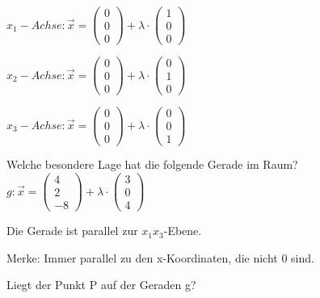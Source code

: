 \documentclass[paper=a6,landscape,ngerman,twoside=true,fontsize=12pt]{scrartcl}
\begin{document}
\begin{antwort}
	\Large
	$x_1-Achse:\vec{x}=\left(\begin{array}{c} 0 \\ 0 \\ 0\end{array} \right)+\lambda \cdot \left(\begin{array}{c} 1 \\ 0 \\ 0\end{array} \right)$
	
	$x_2-Achse:\vec{x}=\left(\begin{array}{c} 0 \\ 0 \\ 0\end{array} \right)+\lambda \cdot \left(\begin{array}{c} 0 \\ 1 \\ 0\end{array} \right)$
	
	$x_3-Achse:\vec{x}=\left(\begin{array}{c} 0 \\ 0 \\ 0\end{array} \right)+\lambda \cdot \left(\begin{array}{c} 0 \\ 0 \\ 1\end{array} \right)$
	
	
\end{antwort}	
\begin{frage}
	\LARGE
	Welche besondere Lage hat die folgende Gerade im Raum?
	$g:\vec{x}=\left(\begin{array}{c} 4 \\ 2 \\ -8\end{array} \right)+\lambda \cdot \left(\begin{array}{c} 3 \\ 0 \\ 4\end{array} \right)$
\end{frage}
\begin{antwort}
	\Large
	Die Gerade ist parallel zur $x_1x_3$-Ebene.
	
	Merke: Immer parallel zu den x-Koordinaten, die nicht 0 sind.
	
	
\end{antwort}	
\begin{frage}
	\LARGE
	Liegt der Punkt P auf der Geraden g?
	
\end{frage}
\end{document}
